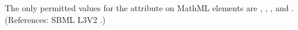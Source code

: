 The only permitted values for the attribute  on MathML
 elements are , , , and
.  (References: SBML L3V2 .)
